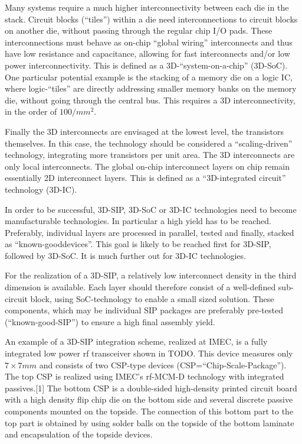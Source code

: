 Many systems require a much higher interconnectivity between
each die in the stack. Circuit blocks (``tiles'') within a die need
interconnections to circuit blocks on another die, without passing
through the regular chip I/O pads. These interconnections must
behave as on-chip ``global wiring'' interconnects and thus have low
resistance and capacitance, allowing for fast interconnects and/or
low power interconnectivity. This is defined as a 3D-``system-on-a-chip'' (3D-SoC). 
One particular potential example is the stacking
of a memory die on a logic IC, where logic-``tiles'' are directly
addressing smaller memory banks on the memory die, without
going through the central bus. This requires a 3D interconnectivity,
in the order of $100/mm^2$.

Finally the 3D interconnects are envisaged at the lowest level,
the transistors themselves. In this case, the technology should
be considered a ``scaling-driven'' technology, integrating more
transistors per unit area. The 3D interconnects are only local
interconnects. The global on-chip interconnect layers on chip
remain essentially 2D interconnect layers. This is defined as a
``3D-integrated circuit'' technology (3D-IC).

In order to be successful, 3D-SIP, 3D-SoC or 3D-IC technologies
need to become manufacturable technologies. In particular a
high yield has to be reached. Preferably, individual layers are
processed in parallel, tested and finally, stacked as ``known-gooddevices''.
This goal is likely to be reached first for 3D-SIP, followed
by 3D-SoC. It is much further out for 3D-IC technologies.

For the realization of a 3D-SIP, a relatively low interconnect density
in the third dimension is available. Each layer should therefore
consist of a well-defined sub-circuit block, using SoC-technology
to enable a small sized solution. These components,
which may be individual SIP packages are preferably pre-tested
(``known-good-SIP'') to ensure a high final assembly yield.

An example of a 3D-SIP integration scheme, realized at IMEC, is
a fully integrated low power rf transceiver shown in TODO.
This device measures only $7 \times 7 mm$ and consists of two CSP-type
devices (CSP=``Chip-Scale-Package''). The top CSP is realized
using IMEC's rf-MCM-D technology with integrated passives.[1]
The bottom CSP is a double-sided high-density printed circuit
board with a high density flip chip die on the bottom side and
several discrete passive components mounted on the topside.
The connection of this bottom part to the top part is obtained by
using solder balls on the topside of the bottom laminate and
encapsulation of the topside devices.

